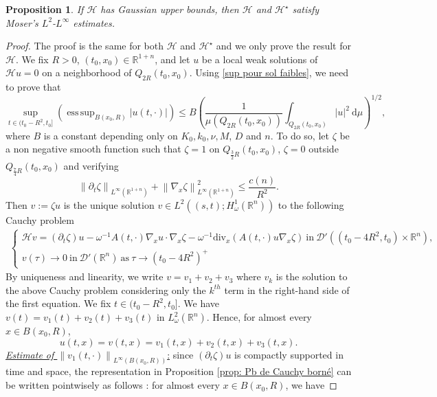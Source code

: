 \documentclass[12pt, letterpaper]{amsart}
\newtheorem{prop}[thm]{Proposition}
\theoremstyle{definition}
\theoremstyle{remark}
\numberwithin{equation}{section}
\DeclareMathOperator*{\supess}{ess\,sup}
\begin{document}
\begin{prop}\label{ThmConverseHK}
    If $\mathcal{H}$ has Gaussian upper bounds, then $\mathcal{H}$ and $\mathcal{H}^\star$ satisfy Moser’s $L^2$-$L^\infty$ estimates.
\end{prop}
\begin{proof}
The proof is the same for both $\mathcal{H}$ and $\mathcal{H}^\star$ and we only prove the result for $\mathcal{H}$. We fix $R>0$, $(t_0,x_0) \in \mathbb{R}^{1+n}$, and let $u$ be a local weak solutions of $\mathcal{H}u=0$ on a neighborhood of $Q_{2R}(t_0,x_0)$.
Using \eqref{sup pour sol faibles}, we need to prove that 
\begin{equation}\label{JJ}
      \sup_{t \in (t_0-R^2, t_0]} \left ( \supess_{B(x_0,R)} \left | u(t,\cdot) \right | \right )   \leq B \left ( \frac{1}{\mu(Q_{2R}(t_0,x_0))} \int_{Q_{2R}(t_0,x_0)} \left | u \right |^2 \ \mathrm d\mu\right  )^{1/2},
\end{equation}
where $B$ is a constant depending only on $K_0,k_0,\nu,M$, $D$ and $n$. To do so, let $\zeta$ be a non negative smooth function such that $\zeta = 1$ on $Q_{\frac{3}{2}R}(t_0,x_0)$, $\zeta = 0$ outside $Q_{\frac{7}{4}R}(t_0,x_0)$ and verifying $$\left \| \partial_t \zeta  \right \|_{L^\infty(\mathbb{R}^{1+n})}+\left \| \nabla_x \zeta  \right \|^2_{L^\infty(\mathbb{R}^{1+n})} \leq \frac{c(n)}{R^2}.$$
Then $v := \zeta u$ is the unique solution $v \in L^2((s,t);H^1_\omega(\mathbb{R}^n))$ to the  following Cauchy problem
\begin{align*}
\left\{
    \begin{array}{ll}
        \mathcal{H} v = (\partial_t \zeta) u - \omega^{-1}A(t,\cdot)\nabla_x u \cdot \nabla_x \zeta - \omega^{-1}\mathrm{div}_x(A(t,\cdot) u \nabla_x \zeta) \ \mathrm{in} \  \mathcal{D}'((t_0-4R^2,t_0) \times \mathbb{R}^n), \\
        v(\tau) \rightarrow 0 \  \mathrm{ in } \ \mathcal{D'}(\mathbb{R}^n) \ \mathrm{as} \ \tau \rightarrow (t_0-4R^2)^+
    \end{array}
\right.
\end{align*} 
By uniqueness and linearity, we write $v=v_1+v_2+v_3$ where $v_k$ is the solution to the above Cauchy problem considering only the $k^{th}$ term in the right-hand side of the first equation. We fix $ t\in (t_0-R^2,t_0]$. We have $v(t)=v_1(t)+v_2(t)+v_3(t)$ in $L^2_\omega(\mathbb{R}^n)$. Hence, for almost every $x \in B(x_0,R)$,
$$u(t,x)=v(t,x)=v_1(t,x)+v_2(t,x)+v_3(t,x).$$
\underline{\textit{Estimate of $\left\| v_1(t,\cdot) \right\|_{L^\infty(B(x_0,R))}$}:} since $(\partial_t \zeta) u$ is compactly supported in time and space, the representation in Proposition \ref{prop: Pb de Cauchy borné} can be written pointwisely as follows : for almost every $x \in B(x_0,R)$, we have

\end{proof}
\end{document}
